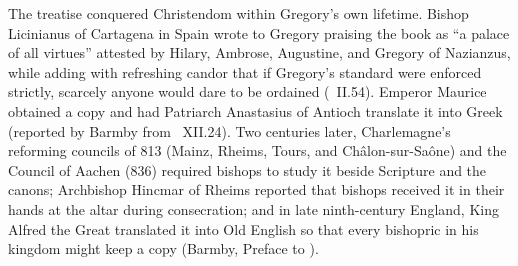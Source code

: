 The treatise conquered Christendom within Gregory's own lifetime. Bishop
Licinianus of Cartagena in Spain wrote to Gregory praising the book as ``a
palace of all virtues'' attested by Hilary, Ambrose, Augustine, and Gregory of
Nazianzus, while adding with refreshing candor that if Gregory's standard were
enforced strictly, scarcely anyone would dare to be ordained (\
II.54). Emperor Maurice obtained a copy and had Patriarch Anastasius of
Antioch translate it into Greek (reported by Barmby from \work{Ep.}\ XII.24).
Two centuries later, Charlemagne's reforming councils of 813 (Mainz, Rheims,
Tours, and Ch\^alon-sur-Sa\^one) and the Council of Aachen (836) required
bishops to study it beside Scripture and the canons; Archbishop Hincmar of
Rheims reported that bishops received it in their hands at the altar during
consecration; and in late ninth-century England, King Alfred the Great
translated it into Old English so that every bishopric in his kingdom might
keep a copy (Barmby, Preface to \work{Regula Pastoralis}).
